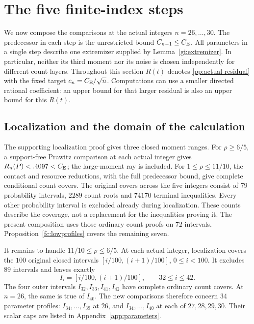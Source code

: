 \section{The five finite-index steps}\label{fc:section}

We now compose the comparisons at the actual integers
$n=26,\ldots,30$. The predecessor in each step is the unrestricted
bound $C_{n-1}\le C_{\mathrm E}$. All parameters in a single step describe
one extremizer supplied by Lemma~\ref{gi:extremizer}.
In particular, neither its third moment nor its noise is chosen
independently for different count layers.
Throughout this section $R(t)$ denotes \eqref{pp:actual-residual}
with the fixed target $c_n=C_{\mathrm E}/\sqrt n$. Computations can use
a smaller directed rational coefficient: an upper bound for that
larger residual is also an upper bound for this $R(t)$.

\subsection{Localization and the domain of the calculation}
The supporting localization proof gives three closed moment ranges.
For $\rho\ge6/5$, a support-free Prawitz comparison at each actual
integer gives $R_n(P)<.4097<C_{\mathrm E}$; the large-moment ray is included.
For $1\le\rho\le11/10$, the contact and resource reductions,
with the full predecessor bound, give complete conditional count
covers. The original covers across the five integers consist of $79$ probability
intervals, $2289$ count roots and $74170$ terminal inequalities.
Every other probability interval is excluded already during
localization. These counts describe the coverage, not a replacement
for the inequalities proving it. The present composition uses those
ordinary count proofs on $72$ intervals.
Proposition~\ref{fc:lowprofiles} covers the remaining seven.

It remains to handle $11/10\le\rho\le6/5$.
At each actual integer, localization covers the $100$ original
closed intervals $[i/100,(i+1)/100]$, $0\le i<100$.
It excludes $89$ intervals and leaves exactly
\[
 I_i=[i/100,(i+1)/100],\qquad 32\le i\le42.
\]
The four outer intervals $I_{32},I_{33},I_{41},I_{42}$ have
complete ordinary count covers. At $n=26$, the same is true of
$I_{40}$. The new comparisons therefore concern $34$ parameter
profiles: $I_{34},\ldots,I_{39}$ at $26$, and
$I_{34},\ldots,I_{40}$ at each of $27,28,29,30$.
Their scalar caps are listed in Appendix~\ref{app:parameters}.

